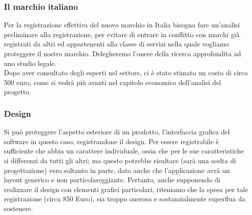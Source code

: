 \subsubsection{Il marchio italiano}
Per la registrazione effettiva del nuovo marchio in Italia bisogna fare un'analisi preliminare alla registrazione, per evitare di entrare in conflitto con marchi già registrati da altri ed appartenenti alla classe di servizi nella quale vogliamo proteggere il nostro marchio. Delegheremo l'onere della ricerca approfondita ad uno studio legale.\\
Dopo aver consultato degli esperti nel settore, ci è stato stimato un costo di circa 500 euro, come si vedrà più avanti nel capitolo economico dell'analisi del progetto.

\subsubsection{Design}
Si può proteggere l'aspetto esteriore di un prodotto, l'interfaccia grafica del software in questo caso, registrandone il design. Per essere registrabile è sufficiente che abbia un carattere individuale, ossia che per le sue caratteristiche si differenzi da tutti gli altri; ma questo potrebbe risultare (sarà una scelta di progettazione) vero soltanto in parte, dato anche che l'applicazione avrà un layout generico e non particolareggiante. Pertanto, anche supponendo di realizzare il design con elementi grafici particolari, riteniamo che la spesa per tale registrazione (circa 850 Euro), sia troppo onerosa e sostanzialmente superflua da sostenere.

